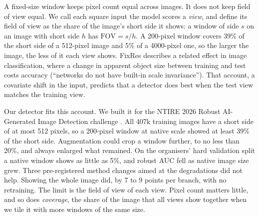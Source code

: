 \documentclass[letterpaper]{article} %
\newcommand{\fov}{\mathrm{FOV}}
\begin{document}
A fixed-size window keeps pixel count equal across images. It does not keep
field of view equal. We call each square input the model scores a \emph{view}, and define
its field of view as the share of the image's short side it shows: a window of
side $s$ on an image with short side $h$ has $\fov = s/h$. A 200-pixel window covers 39\% of the short
side of a 512-pixel image and 5\% of a 4000-pixel one, so the larger the
image, the less of it each view shows. FixRes \cite{touvron2019fixres}
describes a related effect in image classification, where a change in
apparent object size between training and test costs accuracy (``networks do
not have built-in scale invariance''). That account, a covariate
shift \cite{shimodaira2000covariate} in the input, predicts that a detector
does best when the test view matches the training view.

Our detector fits this account. We built it for the NTIRE 2026 Robust AI-Generated Image Detection challenge
\cite{gushchin2026ntire}. All 407k training images have a short side of at
most 512 pixels, so a 200-pixel window at native scale showed at least 39\%
of the short side. Augmentation could crop a window further,
to no less than 20\%, and always enlarged what remained. On the organisers'
hard validation split a native window shows as little as 5\%, and robust AUC
fell as native image size grew. Three pre-registered method changes aimed at
the degradations did not help. Showing the whole image did, by 7 to 9 points
per branch, with no retraining. The limit is the field of view of each view.
Pixel count matters little, and so does \emph{coverage}, the share of the
image that all views show together when we tile it with more windows of the
same size.
\end{document}
